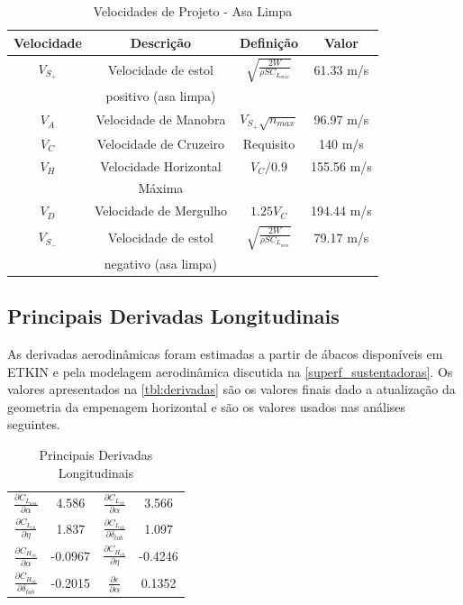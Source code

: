 \begin{table}[H]
\centering
\begin{tabular}{cccc}
\toprule
Velocidade & Descrição & Definição & Valor \\ \midrule
$V_{S_{+}}$ & Velocidade de estol & $ \sqrt{\frac{2 W}{\rho S C_{L_{max}}}} $ & 61.33 m/s \\ [0.3cm]
 & positivo (asa limpa) & &  \\ [0.3cm]
$V_A$ & Velocidade de Manobra & $ V_{S_{+}} \sqrt{n_{max}} $ & 96.97 m/s \\ [0.3cm]
$V_C$ & Velocidade de Cruzeiro & Requisito & 140 m/s \\  [0.3cm]
$V_H$ & Velocidade Horizontal & $V_C/0.9$ & 155.56 m/s \\  [0.3cm]
 & Máxima & &  \\ [0.3cm]
$V_D$ & Velocidade de Mergulho & $1.25 V_C$ & 194.44 m/s \\ [0.3cm]
$V_{S_{-}}$ & Velocidade de estol & $ \sqrt{\frac{2 W}{\rho S C_{L_{min}}}} $ & 79.17 m/s \\ [0.3cm]
 & negativo (asa limpa) & &  \\ [0.3cm]
\bottomrule
\end{tabular}
\caption[Velocidades de Projeto - Asa Limpa]{Velocidades de Projeto - Asa Limpa}
\label{tbl:velocidadesprojeto}
\end{table}

\subsection{Principais Derivadas Longitudinais}
\label{derivadas}

As derivadas aerodinâmicas foram estimadas a partir de ábacos disponíveis em ETKIN e pela modelagem aerodinâmica discutida na \autoref{superf_sustentadoras}. Os valores apresentados na \autoref{tbl:derivadas} são os valores finais dado a atualização da geometria da empenagem horizontal e são os valores usados nas análises seguintes.

\begin{table}[H]
\centering
\begin{tabular}{cccc}
\toprule
$ \frac{\partial C_{L_{asa}}}{\partial \alpha} $ & 4.586 & $ \frac{\partial C_{L_{eh}}}{\partial \alpha} $ & 3.566 \\ [0.3cm]
$ \frac{\partial C_{L_{eh}}}{\partial \eta} $ & 1.837 & $ \frac{\partial C_{L_{eh}}}{\partial \delta_{tab}} $ & 1.097 \\ [0.3cm]
$ \frac{\partial C_{H_{eh}}}{\partial \alpha} $ & -0.0967  & $ \frac{\partial C_{H_{eh}}}{\partial \eta} $ & -0.4246 \\ [0.3cm]
$ \frac{\partial C_{H_{eh}}}{\partial \delta_{tab}} $ & -0.2015 & $ \frac{\partial \epsilon}{\partial \alpha} $ & 0.1352 \\ [0.3cm]
\bottomrule
\end{tabular}
\caption[Principais Derivadas Longitudinais]{Principais Derivadas Longitudinais}
\label{tbl:derivadas}
\end{table}

